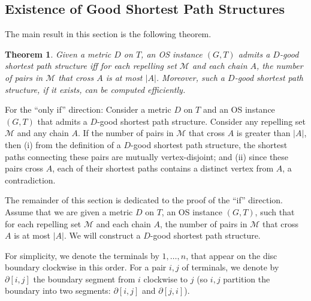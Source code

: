 \documentclass[11pt]{article}
\newtheorem{theorem}{Theorem}
\newcommand{\mset}{{\mathcal M}}
\begin{document}
\subsection{Existence of Good Shortest Path Structures}
\label{sec: repelling path theorem}

The main result in this section is the following theorem.

\begin{theorem}
\label{thm:repelling-paths}
Given a metric $D$ on $T$, an OS instance $(G,T)$ admits a $D$-good shortest path structure iff for each repelling set $\mset$ and each chain $A$, the number of pairs in $\mset$ that cross $A$ is at most $|A|$. Moreover, such a $D$-good shortest path structure, if it exists, can be computed efficiently.
\end{theorem}

For the ``only if'' direction: Consider a metric $D$ on $T$ and an OS instance $(G,T)$ that admits a $D$-good shortest path structure. Consider any repelling set $\mset$ and any chain $A$. If the number of pairs in $\mset$ that cross $A$ is greater than $|A|$, then (i) from the definition of a $D$-good shortest path structure, the shortest paths connecting these pairs are mutually vertex-disjoint; and (ii) since these pairs cross $A$, each of their shortest paths contains a distinct vertex from $A$, a contradiction.

The remainder of this section is dedicated to the proof of the ``if'' direction. Assume that we are given a metric $D$ on $T$, an OS instance $(G,T)$, such that for each repelling set $\mset$ and each chain $A$, the number of pairs in $\mset$ that cross $A$ is at most $|A|$. We will construct a $D$-good shortest path structure.

For simplicity, we denote the terminals by $1,\ldots,n$, that appear on the disc boundary clockwise in this order. For a pair $i,j$ of terminals, we denote by $\partial[i,j]$ the boundary segment from $i$ clockwise to $j$ (so $i,j$ partition the boundary into two segments: $\partial[i,j]$ and $\partial[j,i]$). %
\end{document}
